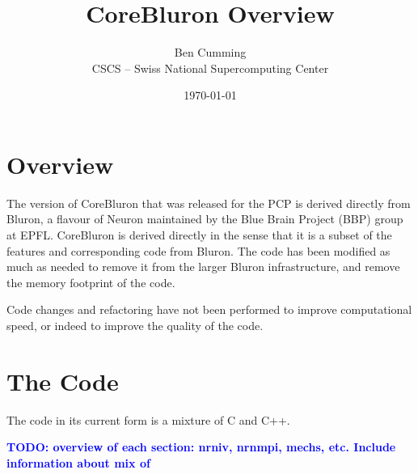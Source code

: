 \documentclass[11pt,a4paper]{article}
\newcommand{\todo}[1]{\textbf{\textcolor{blue}{TODO: #1}}} %
\begin{document}
\title{CoreBluron Overview}
\author{Ben Cumming\\CSCS -- Swiss National Supercomputing Center}
\date{\today}
\maketitle


\section{Overview}
The version of CoreBluron that was released for the PCP is derived directly from Bluron, a flavour of Neuron maintained by the Blue Brain Project (BBP) group at EPFL. CoreBluron is derived directly in the sense that it is a subset of the features and corresponding code from Bluron. The code has been modified as much as needed to remove it from the larger Bluron infrastructure, and remove the memory footprint of the code.

Code changes and refactoring have not been performed to improve computational speed, or indeed to improve the quality of the code.

\section{The Code}
The code in its current form is a mixture of C and C++.

\todo{overview of each section: nrniv, nrnmpi, mechs, etc. Include information about mix of }

\end{document}
